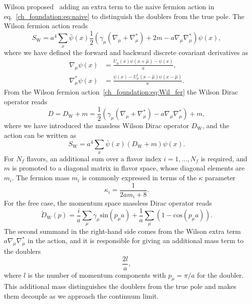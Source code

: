 Wilson proposed~\citep{Wilson:1974sk} adding an extra term to the naive fermion action in eq.~\eqref{ch_foundation:eq:naive} to distinguish the doublers from the true pole. The Wilson fermion action reads
\begin{equation}
\label{ch_foundation:eq:Wil_fer}
S_{\textrm{W}}=a^4\sum_x\bar{\psi}(x)\frac{1}{2}\left(\gamma_{\mu}\left(\nabla_{\mu}+\nabla_{\mu}^*\right)+2m-a\nabla_{\mu}\nabla_{\mu}^*\right)\psi(x),
\end{equation}
where we have defined the forward and backward discrete covariant derivatives as
\begin{align}
\nabla_{\mu}\psi(x)&=\frac{U_{\mu}(x)\psi(x+\hat{\mu})-\psi(x)}{a},\\
\nabla_{\mu}^*\psi(x)&=\frac{\psi(x)-U_{\mu}^{\dagger}(x-\hat{\mu})\psi(x-\hat{\mu})}{a}.
\end{align}
From the Wilson fermion action~\eqref{ch_foundation:eq:Wil_fer} the Wilson Dirac operator reads
\begin{equation}
\label{ch_foundation:eq:DW}
D=D_{\textrm{W}}+m=\frac{1}{2}\left(\gamma_{\mu}\left(\nabla_{\mu}+\nabla_{\mu}^*\right)-a\nabla_{\mu}\nabla_{\mu}^*\right)+m,
\end{equation}
where we have introduced the massless Wilson Dirac operator $D_{\textrm{W}}$, and the action can be written as
\begin{equation}
S_{\textrm{W}}=a^4\sum_x\bar{\psi}(x)\left(D_{\textrm{W}}+m\right)\psi(x).
\end{equation}
For $N_f$ flavors, an additional sum over a flavor index $i=1,...,N_f$ is required, and $m$ is promoted to a diagonal matrix in flavor space, whose diagonal elements are $m_i$. The fermion mass $m_i$ is commonly expressed in terms of the $\kappa$ parameter
\begin{equation}
\label{ch_foundation:eq:kappa}
\kappa_i=\frac{1}{2am_i+8}.
\end{equation}
For the free case, the momentum space massless Dirac operator reads
\begin{equation}
\tilde{D}_{\textrm{W}}(p)=\frac{i}{a}\sum_{\mu}\gamma_{\mu}\textrm{sin}(p_{\mu}a)+\frac{1}{a}\sum_{\mu}\left(1-\textrm{cos}(p_{\mu}a)\right).
\end{equation}
The second summand in the right-hand side comes from the Wilson extra term $a\nabla_{\mu}\nabla_{\mu}^*$ in the action, and it is responsible for giving an additional mass term to the doublers
\begin{equation}
\frac{2l}{a},
\end{equation}
where $l$ is the number of momentum components with $p_{\mu}=\pi/a$ for the doubler. This additional mass distinguishes the doublers from the true pole and makes them decouple as we approach the continuum limit.


